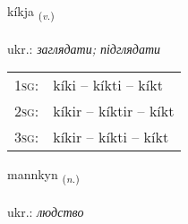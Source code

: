 \documentclass[frontgrid, backgrid]{flacards}\usepackage[]{graphicx}\usepackage[]{xcolor}
\begin{document}
\renewcommand{\flhead}{\vskip5pt \fboxsep=0pt {\small\bfseries\footnotesize Sagnorð | дієслово}}
\renewcommand{\fcfoot}{\vskip5pt \fboxsep=0pt \hspace{2pt}{\small\bfseries\footnotesize 3K}}

\renewcommand{\blhead}{\vskip5pt {\small\bfseries\footnotesize Sagnorð | дієслово }}
\renewcommand{\bcfoot}{\vskip5pt \hspace{2pt}{\small\bfseries\footnotesize 3K}}


{kíkja \small{\textsubscript{(\textit{v.})}} \\[1ex] %
\textphonetic{[cʰiːca]} \\
ukr.: \emph{заглядати; підглядати} \\  [2ex]
\renewcommand*{\arraystretch}{0.8}
\begin{tabular}{p{1cm}l}
\textsc{1sg}: & kíki -- kíkti -- kíkt \\ 
\textsc{2sg}: & kíkir -- kíktir -- kíkt \\ 
\textsc{3sg}: & kíkir -- kíkti -- kíkt \\ 
\end{tabular}
}

\renewcommand{\flhead}{\vskip5pt \fboxsep=0pt {\small\bfseries\footnotesize Nafnorð | іменник}}
\renewcommand{\fcfoot}{\vskip5pt \fboxsep=0pt \hspace{2pt}{\small\bfseries\footnotesize 3K}}

\renewcommand{\blhead}{\vskip5pt {\small\bfseries\footnotesize Nafnorð | іменник }}
\renewcommand{\bcfoot}{\vskip5pt \hspace{2pt}{\small\bfseries\footnotesize 3K}}


{mannkyn \small{\textsubscript{(\textit{n.})}} \\[1ex] %
\textphonetic{[maɲcʰɪn]} \\
ukr.: \emph{людство} \\  [2ex]
\renewcommand*{\arraystretch}{0.8}
}
\end{document}
